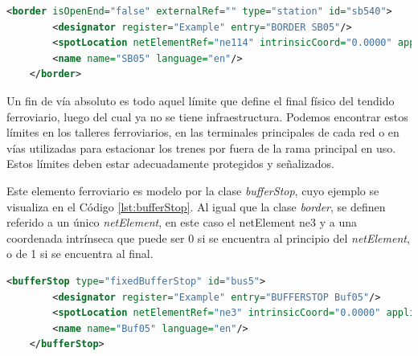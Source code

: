     \begin{lstlisting}[language = XML, caption = Clase \textit{Border} , label = {lst:lineBorder}]
    <border isOpenEnd="false" externalRef="" type="station" id="sb540">
        <designator register="Example" entry="BORDER SB05"/>
        <spotLocation netElementRef="ne114" intrinsicCoord="0.0000" applicationDirection="reverse" id="sb540_sloc01"/>
        <name name="SB05" language="en"/>
    </border>
    \end{lstlisting}

    Un fin de vía absoluto es todo aquel límite que define el final físico del tendido ferroviario, luego del cual ya no se tiene infraestructura. Podemos encontrar estos límites en los talleres ferroviarios, en las terminales principales de cada red o en vías utilizadas para estacionar los trenes por fuera de la rama principal en uso. Estos límites deben estar adecuadamente protegidos y señalizados.

    Este elemento ferroviario es modelo por la clase \textit{bufferStop}, cuyo ejemplo se visualiza en el Código \ref{lst:bufferStop}. Al igual que la clase \textit{border}, se definen referido a un único \textit{netElement}, en este caso el netElement ne3 y a una coordenada intrínseca que puede ser 0 si se encuentra al principio del \textit{netElement}, o de 1 si se encuentra al final.
    
    \begin{lstlisting}[language = XML, caption = Clase \textit{BufferStop} , label = {lst:bufferStop}]
    <bufferStop type="fixedBufferStop" id="bus5">
        <designator register="Example" entry="BUFFERSTOP Buf05"/>
        <spotLocation netElementRef="ne3" intrinsicCoord="0.0000" applicationDirection="reverse" id="bus5_sloc01"/>
        <name name="Buf05" language="en"/>
    </bufferStop>
    \end{lstlisting}
